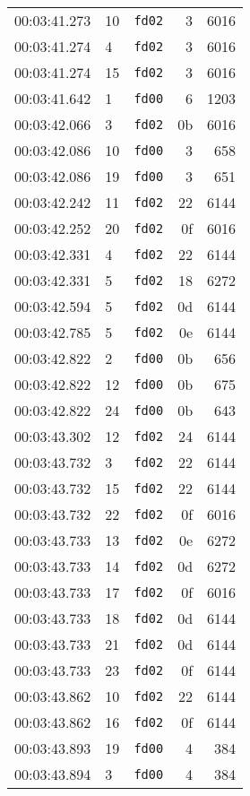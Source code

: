 \documentclass{article}
\begin{document}
\begin{longtable}{lllrr}
00:03:41.273 & 10 & \texttt{fd02} & 3 & 6016 \\
00:03:41.274 & 4 & \texttt{fd02} & 3 & 6016 \\
00:03:41.274 & 15 & \texttt{fd02} & 3 & 6016 \\
00:03:41.642 & 1 & \texttt{fd00} & 6 & 1203 \\
00:03:42.066 & 3 & \texttt{fd02} & 0b & 6016 \\
00:03:42.086 & 10 & \texttt{fd00} & 3 & 658 \\
00:03:42.086 & 19 & \texttt{fd00} & 3 & 651 \\
00:03:42.242 & 11 & \texttt{fd02} & 22 & 6144 \\
00:03:42.252 & 20 & \texttt{fd02} & 0f & 6016 \\
00:03:42.331 & 4 & \texttt{fd02} & 22 & 6144 \\
00:03:42.331 & 5 & \texttt{fd02} & 18 & 6272 \\
00:03:42.594 & 5 & \texttt{fd02} & 0d & 6144 \\
00:03:42.785 & 5 & \texttt{fd02} & 0e & 6144 \\
00:03:42.822 & 2 & \texttt{fd00} & 0b & 656 \\
00:03:42.822 & 12 & \texttt{fd00} & 0b & 675 \\
00:03:42.822 & 24 & \texttt{fd00} & 0b & 643 \\
00:03:43.302 & 12 & \texttt{fd02} & 24 & 6144 \\
00:03:43.732 & 3 & \texttt{fd02} & 22 & 6144 \\
00:03:43.732 & 15 & \texttt{fd02} & 22 & 6144 \\
00:03:43.732 & 22 & \texttt{fd02} & 0f & 6016 \\
00:03:43.733 & 13 & \texttt{fd02} & 0e & 6272 \\
00:03:43.733 & 14 & \texttt{fd02} & 0d & 6272 \\
00:03:43.733 & 17 & \texttt{fd02} & 0f & 6016 \\
00:03:43.733 & 18 & \texttt{fd02} & 0d & 6144 \\
00:03:43.733 & 21 & \texttt{fd02} & 0d & 6144 \\
00:03:43.733 & 23 & \texttt{fd02} & 0f & 6144 \\
00:03:43.862 & 10 & \texttt{fd02} & 22 & 6144 \\
00:03:43.862 & 16 & \texttt{fd02} & 0f & 6144 \\
00:03:43.893 & 19 & \texttt{fd00} & 4 & 384 \\
00:03:43.894 & 3 & \texttt{fd00} & 4 & 384 \\

\end{longtable}
\end{document}
